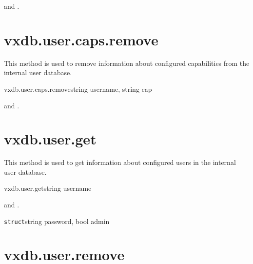 \begin{rpcaccess}
 and \rpcnoownerchecks.
\end{rpcaccess}


\rpcnoerrors


\section{vxdb.user.caps.remove}

This method is used to remove information about configured capabilities from
the internal user database.

\begin{rpcsynopsis}{vxdb.user.caps.remove}{string username, string cap}
\end{rpcsynopsis}

\begin{rpcaccess}
 and \rpcnoownerchecks.
\end{rpcaccess}

\rpcreturnnil

\rpcnoerrors


\section{vxdb.user.get}

This method is used to get information about configured users in the internal
user database.

\begin{rpcsynopsis}{vxdb.user.get}{string username}
\end{rpcsynopsis}

\begin{rpcaccess}
 and \rpcnoownerchecks.
\end{rpcaccess}

\begin{rpcreturncomplex}{\texttt{struct}}{string password, bool admin}
\end{rpcreturncomplex}


\section{vxdb.user.remove}

